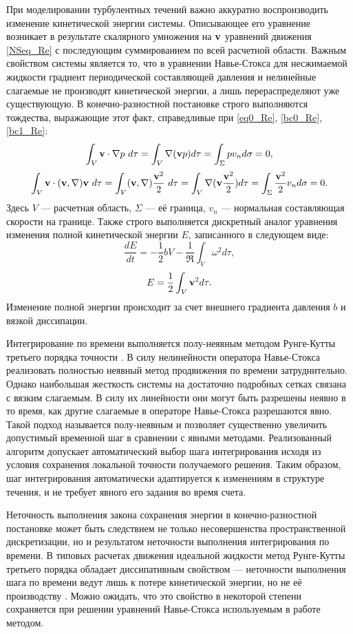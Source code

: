 При моделировании турбулентных течений важно аккуратно воспроизводить изменение кинетической энергии системы. Описывающее его уравнение возникает в результате скалярного умножения на $\mathbf{v}$ уравнений движения \eqref{NSeq_Re} с последующим суммированием по всей расчетной области. Важным свойством системы является то, что в уравнении Навье-Стокса для несжимаемой жидкости градиент периодической составляющей давления и нелинейные слагаемые не производят кинетической энергии, а лишь перераспределяют уже существующую. В конечно-разностной постановке строго выполняются тождества, выражающие этот факт, справедливые при \eqref{eq0_Re}, \eqref{bc0_Re}, \eqref{bc1_Re}:
$$
\int_V \mathbf{v} \cdot \nabla p\ d\tau= \int_V \nabla (\mathbf{v} p) d\tau = \int_{\Sigma} p v_n d\sigma = 0, 
$$
$$
\int_V \mathbf{v} \cdot (\mathbf{v}, \nabla) \mathbf{v}\ d\tau = \int_V (\mathbf{v}, \nabla)\frac{\mathbf{v}^2}{2}\ d\tau = \int_V \nabla (\mathbf{v} \frac{\mathbf{v}^2}{2}) d\tau = \int_{\Sigma} \frac{\mathbf{v}^2}{2} v_n d\sigma = 0.
$$
Здесь $V$ --- расчетная область, $\Sigma$ --- её граница, $v_n$ --- нормальная составляющая скорости на границе. Также строго выполняется дискретный аналог уравнения изменения полной кинетической энергии $E$, записанного в следующем виде:
\begin{equation} \label{Eeq}
\frac{d E}{d t} = - \frac{1}{2}bV - \frac{1}{\Re} \int_{V} \omega^2 d\tau,
\end{equation}
$$
E = \frac{1}{2}\int_{V} \mathbf{v}^2 d\tau.
$$
Изменение полной энергии происходит за счет внешнего градиента давления $b$ и вязкой диссипации. 

Интегрирование по времени выполняется полу-неявным методом Рунге-Кутты третьего порядка точности \cite{Nikitin2006third}. В силу нелинейности оператора Навье-Стокса реализовать полностью неявный метод продвижения по времени затруднительно. Однако наибольшая жесткость системы на достаточно подробных сетках связана с вязким слагаемым. В силу их линейности они могут быть разрешены неявно в то время, как другие слагаемые в операторе Навье-Стокса разрешаются явно. Такой подход называется полу-неявным и позволяет существенно увеличить допустимый временной шаг в сравнении с явными методами. Реализованный алгоритм допускает автоматический выбор шага интегрирования исходя из условия сохранения локальной точности получаемого решения. Таким образом, шаг интегрирования автоматически адаптируется к изменениям в структуре течения, и не требует явного его задания во время счета. 

Неточность выполнения закона сохранения энергии в конечно-разностной постановке может быть следствием не только несовершенства пространственной дискретизации, но и результатом неточности выполнения интегрирования по времени. В типовых расчетах движения идеальной жидкости метод Рунге-Кутты третьего порядка обладает диссипативным свойством --- неточности выполнения шага по времени ведут лишь к потере кинетической энергии, но не её производству \cite{Nikitin2006}. Можно ожидать, что это свойство в некоторой степени сохраняется при решении уравнений Навье-Стокса используемым в работе методом. 

